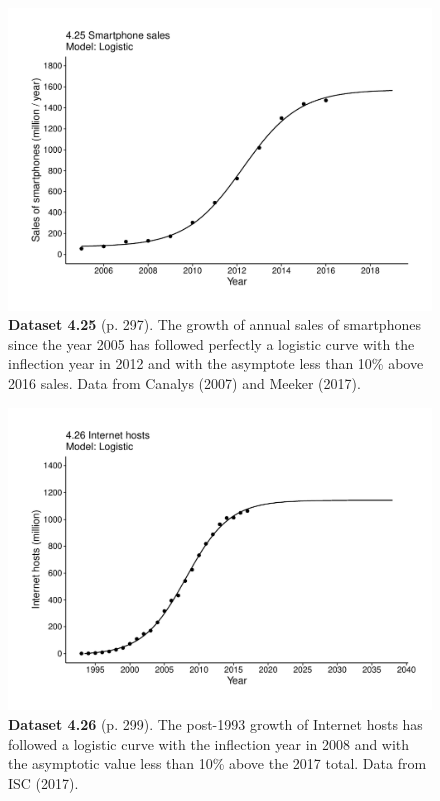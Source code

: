 \documentclass[aps,rmp,preprint,superscriptaddress,10pt,onecolumn]{article}
\begin{document}
\clearpage
\begin{figure}[h]
\includegraphics[width=\textwidth]{output/figs-ggplot/4.25.pdf}
\caption*{\textbf{Dataset 4.25} (p. 297). The growth of annual sales of smartphones since the year 2005 has followed perfectly a logistic curve with the inflection year in 2012 and with the asymptote less than 10\% above 2016 sales. Data from Canalys (2007) and Meeker (2017).}
\end{figure}
	
\clearpage
\begin{figure}[h]
\includegraphics[width=\textwidth]{output/figs-ggplot/4.26.pdf}
\caption*{\textbf{Dataset 4.26} (p. 299). The post-1993 growth of Internet hosts has followed a logistic curve with the inflection year in 2008 and with the asymptotic value less than 10\% above the 2017 total. Data from ISC (2017). }
\end{figure}
	
\end{document}
